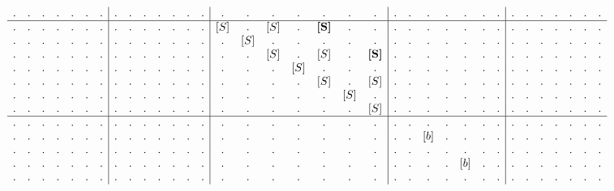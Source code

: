 \begin{example}
\begin{align}
\begin{array}{c c c c c c c | c c c c c c c | c c c c c c c | c c c c c c c | c c c c c c c}
. & . & . & . & . & . & .  &  . & .   & . & .   & . & .   & .  &  . & . & . & . & . & . & .  &  . & . & . & . & . & . & .  &  . & . & . & . & . & . & .   \\
\hline
. & . & . & . & . & . & .  &  . & . & . & . & . & . & .  &  [S] & .   & [S] & .   & \textbf{[S]} & .   & .             &  . & . & . & . & . & . & .  &  . & . & . & . & . & . & .   \\
. & . & . & . & . & . & .  &  . & . & . & . & . & . & .  &  .   & [S] & .   & .   & .            & .   & .             &  . & . & . & . & . & . & .  &  . & . & . & . & . & . & .   \\
. & . & . & . & . & . & .  &  . & . & . & . & . & . & .  &  .   & .   & [S] & .   & [S]          & .   & \textbf{[S]}  &  . & . & . & . & . & . & .  &  . & . & . & . & . & . & .   \\
. & . & . & . & . & . & .  &  . & . & . & . & . & . & .  &  .   & .   & .   & [S] & .            & .   & .             &  . & . & . & . & . & . & .  &  . & . & . & . & . & . & .   \\
. & . & . & . & . & . & .  &  . & . & . & . & . & . & .  &  .   & .   & .   & .   & [S]          & .   & [S]           &  . & . & . & . & . & . & .  &  . & . & . & . & . & . & .   \\
. & . & . & . & . & . & .  &  . & . & . & . & . & . & .  &  .   & .   & .   & .   & .            & [S] & .             &  . & . & . & . & . & . & .  &  . & . & . & . & . & . & .   \\
. & . & . & . & . & . & .  &  . & . & . & . & . & . & .  &  .   & .   & .   & .   & .            & .   & [S]           &  . & . & . & . & . & . & .  &  . & . & . & . & . & . & .   \\
\hline
. & . & . & . & . & . & .  &  . & . & . & . & . & . & .  &  . & . & . & . & . & . & .  &  . & . & .   & . & .   & . & .    &  . & . & . & . & . & . & .   \\
. & . & . & . & . & . & .  &  . & . & . & . & . & . & .  &  . & . & . & . & . & . & .  &  . & . & [b] & . & .   & . & .    &  . & . & . & . & . & . & .   \\
. & . & . & . & . & . & .  &  . & . & . & . & . & . & .  &  . & . & . & . & . & . & .  &  . & . & .   & . & .   & . & .    &  . & . & . & . & . & . & .   \\
. & . & . & . & . & . & .  &  . & . & . & . & . & . & .  &  . & . & . & . & . & . & .  &  . & . & .   & . & [b] & . & .    &  . & . & . & . & . & . & .   \\
. & . & . & . & . & . & .  &  . & . & . & . & . & . & .  &  . & . & . & . & . & . & .  &  . & . & .   & . & .   & . & .    &  . & . & . & . & . & . & .   \\

\end{array}
\end{align}
\end{example}
